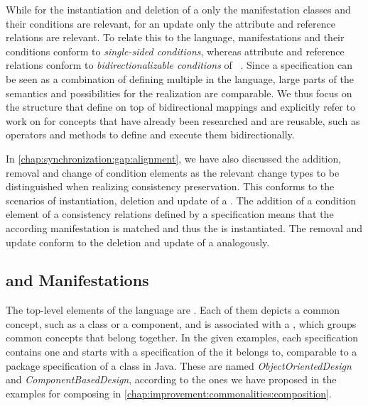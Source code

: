 While for the instantiation and deletion of a \commonality only the manifestation classes and their conditions are relevant, for an update only the attribute and reference relations are relevant.
To relate this to the \mappings language, manifestations and their conditions conform to \emph{single-sided conditions}, whereas attribute and reference relations conform to \emph{bidirectionalizable conditions} of \mappings~\cite[Sec.~7.2.1]{klare2020Vitruv-JSS}.
Since a \commonalities specification can be seen as a combination of defining multiple \mappings in the \mappings language, large parts of the semantics and possibilities for the realization are comparable.
We thus focus on the structure that \commonalities define on top of bidirectional mappings and explicitly refer to work on \mappings for concepts that have already been researched and are reusable, such as operators and methods to define and execute them bidirectionally.

In \autoref{chap:synchronization:gap:alignment}, we have also discussed the addition, removal and change of condition elements as the relevant change types to be distinguished when realizing consistency preservation.
This conforms to the scenarios of instantiation, deletion and update of a \commonality.
The addition of a condition element of a consistency relations defined by a \commonality specification means that the according manifestation is matched and thus the \commonality is instantiated.
The removal and update conform to the deletion and update of a \commonality analogously.


\subsection{\Commonalities and Manifestations}

The top-level elements of the \commonalities language are \commonalities.
Each of them depicts a common concept, such as a class or a component, and is associated with a \conceptmetamodel, which groups common concepts that belong together.
In the given examples, each specification contains one \commonality and starts with a specification of the \conceptmetamodel it belongs to, comparable to a package specification of a class in Java.
These \conceptmetamodels are named \emph{ObjectOrientedDesign} and \emph{ComponentBasedDesign}, according to the ones we have proposed in the examples for composing \commonalities in \autoref{chap:improvement:commonalities:composition}.

